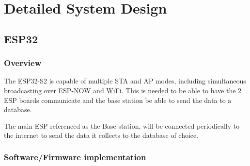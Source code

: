 \chapter{Detailed System Design}
\section{ESP32}

\subsection{Overview}
The ESP32-S2 is capable of multiple STA and AP modes, including simultaneous broadcasting over ESP-NOW and WiFi. This is needed to be able to have the 2 ESP boards communicate and the base station be able to send the data to a database.

\noindent
The main ESP referenced as the Base station, will be connected periodically to the internet to send the data it collects to the database of choice. 

\subsection{Software/Firmware implementation}



